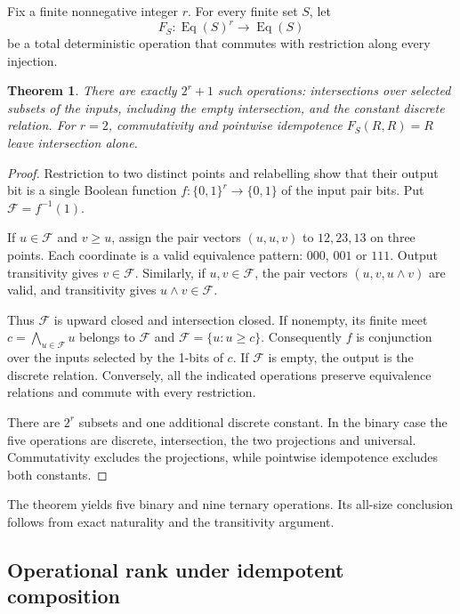 \documentclass[11pt,letterpaper]{article}
\newtheorem{theorem}{Theorem}[section]
\begin{document}
Fix a finite nonnegative integer \(r\). For every finite set \(S\), let
\[
 F_S:\operatorname{Eq}(S)^r\longrightarrow\operatorname{Eq}(S)
\]
be a total deterministic operation that commutes with restriction along
every injection.

\begin{theorem}
There are exactly \(2^r+1\) such operations: intersections over selected
subsets of the inputs, including the empty intersection, and the constant
discrete relation. For \(r=2\), commutativity and pointwise idempotence
\(F_S(R,R)=R\) leave intersection alone.
\end{theorem}
\begin{proof}
Restriction to two distinct points and relabelling show that their output
bit is a single Boolean function \(f:\{0,1\}^r\to\{0,1\}\) of the input
pair bits. Put \(\mathcal F=f^{-1}(1)\).

If \(u\in\mathcal F\) and \(v\ge u\), assign the pair vectors
\((u,u,v)\) to \(12,23,13\) on three points. Each coordinate is a valid
equivalence pattern: \(000\), \(001\) or \(111\). Output transitivity gives
\(v\in\mathcal F\). Similarly, if \(u,v\in\mathcal F\), the pair vectors
\((u,v,u\wedge v)\) are valid, and transitivity gives
\(u\wedge v\in\mathcal F\).

Thus \(\mathcal F\) is upward closed and intersection closed. If nonempty,
its finite meet \(c=\bigwedge_{u\in\mathcal F}u\) belongs to \(\mathcal F\)
and \(\mathcal F=\{u:u\ge c\}\). Consequently \(f\) is conjunction over
the inputs selected by the 1-bits of \(c\).
If \(\mathcal F\) is empty, the output is the discrete relation.
Conversely, all the indicated operations preserve equivalence relations
and commute with every restriction.

There are \(2^r\) subsets and one additional discrete constant.
In the binary case the five operations are discrete, intersection, the
two projections and universal. Commutativity excludes the projections,
while pointwise idempotence excludes both constants.
\end{proof}

The theorem yields five binary and nine ternary operations. Its all-size
conclusion follows from exact naturality and the transitivity argument.

\subsection{Operational rank under idempotent composition}
\end{document}
